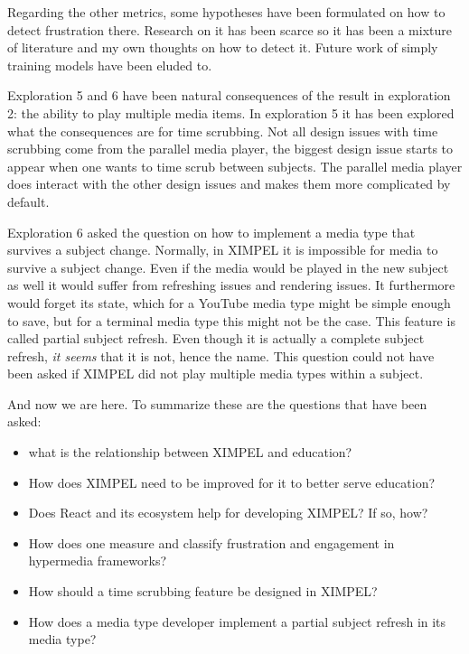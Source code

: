 Regarding the other metrics, some hypotheses have been formulated on how to detect frustration there. Research on it has been scarce so it has been a mixture of literature and my own thoughts on how to detect it. Future work of simply training models have been eluded to.

Exploration 5 and 6 have been natural consequences of the result in exploration 2: the ability to play multiple media items. In exploration 5 it has been explored what the consequences are for time scrubbing. Not all design issues with time scrubbing come from the parallel media player, the biggest design issue starts to appear when one wants to time scrub between subjects. The parallel media player does interact with the other design issues and makes them more complicated by default.

Exploration 6 asked the question on how to implement a media type that survives a subject change. Normally, in XIMPEL it is impossible for media to survive a subject change. Even if the media would be played in the new subject as well it would suffer from refreshing issues and rendering issues. It furthermore would forget its state, which for a YouTube media type might be simple enough to save, but for a terminal media type this might not be the case. This feature is called partial subject refresh. Even though it is actually a complete subject refresh, \textit{it seems} that it is not, hence the name. This question could not have been asked if XIMPEL did not play multiple media types within a subject.

And now we are here. To summarize these are the questions that have been asked:
\begin{itemize}
    \item what is the relationship between XIMPEL and education? 
    \item How does XIMPEL need to be improved for it to better serve education? 
    \item Does React and its ecosystem help for developing XIMPEL? If so, how?
    \item How does one measure and classify frustration and engagement in hypermedia frameworks?
    \item How should a time scrubbing feature be designed in XIMPEL?
    \item How does a media type developer implement a partial subject refresh in its media type?
\end{itemize}

